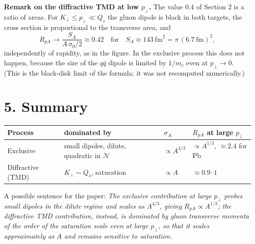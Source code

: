 \documentclass[12pt]{article}
\begin{document}
\textbf{Remark on the diffractive TMD at low $p_\perp$.} The value $0.4$ of Section 2 is a ratio of
areas. For $K_\perp\leq p_\perp\ll Q_s$ the gluon dipole is black in both targets, the cross section is
proportional to the transverse area, and
\[
  R_{pA}\to\frac{S_A}{A\,\sigma_0/2}\approx0.42
  \quad\text{for}\quad S_A\approx143~\text{fm}^2=\pi\,(6.7~\text{fm})^2 ,
\]
independently of rapidity, as in the figure. In the exclusive process this does not happen, because
the size of the $q\bar q$ dipole is limited by $1/m_c$ even at $p_\perp\to0$. (This is the black-disk
limit of the formula; it was not recomputed numerically.)

\section*{5. Summary}

\begin{center}
\begin{tabular}{llll}
\toprule
Process & dominated by & $\sigma_A$ & $R_{pA}$ at large $p_\perp$ \\
\midrule
Exclusive & small dipoles, dilute, quadratic in $\mathcal{N}$ & $\propto A^{4/3}$ & $\propto A^{1/3}$, $\approx2.4$ for Pb \\
Diffractive (TMD) & $K_\perp\sim Q_s$, saturation & $\propto A$ & $\approx0.9$--$1$ \\
\bottomrule
\end{tabular}
\end{center}

A possible sentence for the paper: \emph{The exclusive contribution at large $p_\perp$ probes small
dipoles in the dilute regime and scales as $A^{4/3}$, giving $R_{pA}\propto A^{1/3}$; the diffractive
TMD contribution, instead, is dominated by gluon transverse momenta of the order of the saturation scale
even at large $p_\perp$, so that it scales approximately as $A$ and remains sensitive to saturation.}
\end{document}
